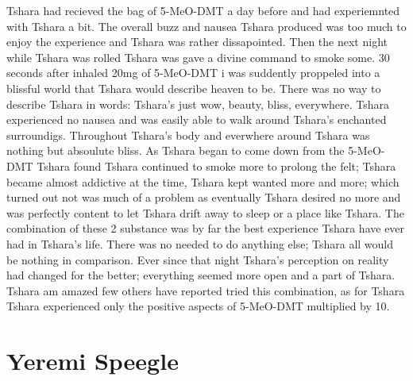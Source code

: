 \documentclass[12pt]{book}
\begin{document}
Tshara had recieved the bag of 5-MeO-DMT a day before and had experiemnted with Tshara a bit. The overall buzz and nausea Tshara produced was too much to enjoy the experience and Tshara was rather dissapointed. Then the next night while Tshara was rolled Tshara was gave a divine command to smoke some. 30 seconds after inhaled 20mg of 5-MeO-DMT i was suddently proppeled into a blissful world that Tshara would describe heaven to be. There was no way to describe Tshara in words: Tshara's just wow, beauty, bliss, everywhere. Tshara experienced no nausea and was easily able to walk around Tshara's enchanted surroundigs. Throughout Tshara's body and everwhere around Tshara was nothing but absoulute bliss. As Tshara began to come down from the 5-MeO-DMT Tshara found Tshara continued to smoke more to prolong the felt; Tshara became almost addictive at the time, Tshara kept wanted more and more; which turned out not was much of a problem as eventually Tshara desired no more and was perfectly content to let Tshara drift away to sleep or a place like Tshara. The combination of these 2 substance was by far the best experience Tshara have ever had in Tshara's life. There was no needed to do anything else; Tshara all would be nothing in comparison. Ever since that night Tshara's perception on reality had changed for the better; everything seemed more open and a part of Tshara. Tshara am amazed few others have reported tried this combination, as for Tshara Tshara experienced only the positive aspects of 5-MeO-DMT multiplied by 10.



\chapter{Yeremi Speegle}
\end{document}
